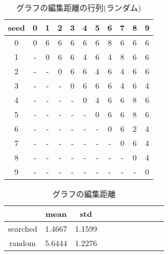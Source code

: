 \documentclass[twocolumn]{jarticle}     %
\begin{document}
\begin{table}[tb]
  \begin{center}
    \caption{グラフの編集距離の行列(ランダム)}
    \begin{tabular}{|c||c|c|c|c|c|c|c|c|c|c|} \hline
      seed & 0 & 1 & 2 & 3 & 4 & 5 & 6 & 7 & 8 & 9 \\ \hline \hline
      0 & 0 & 6 & 6 & 6 & 6 & 6 & 8 & 6 & 6 & 6 \\ \hline
      1 & - & 0 & 6 & 6 & 4 & 6 & 4 & 8 & 6 & 6 \\ \hline
      2 & - & - & 0 & 6 & 6 & 4 & 6 & 4 & 6 & 6 \\ \hline
      3 & - & - & - & 0 & 6 & 6 & 6 & 4 & 6 & 4 \\ \hline
      4 & - & - & - & - & 0 & 4 & 6 & 6 & 8 & 6 \\ \hline
      5 & - & - & - & - & - & 0 & 6 & 6 & 8 & 6 \\ \hline
      6 & - & - & - & - & - & - & 0 & 6 & 2 & 4 \\ \hline
      7 & - & - & - & - & - & - & - & 0 & 6 & 4 \\ \hline
      8 & - & - & - & - & - & - & - & - & 0 & 4 \\ \hline
      9 & - & - & - & - & - & - & - & - & - & 0 \\ \hline
    \end{tabular}
    \label{tab:dist_random}
  \end{center}
\end{table}


\begin{table}[tb]
  \begin{center}
    \caption{グラフの編集距離}
    \begin{tabular}{|c||c|c|c|c|c|c|c|c|c|c|} \hline
       & mean & std \\ \hline \hline
      searched & 1.4667 & 1.1599 \\ \hline
      random & 5.6444 & 1.2276 \\ \hline
    \end{tabular}
    \label{tab:dist}
  \end{center}
\end{table}
\end{document}
